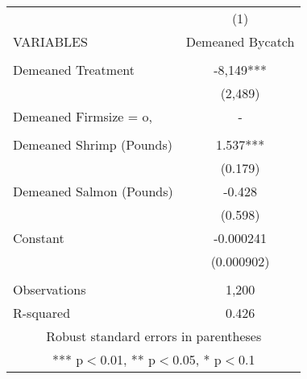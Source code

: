 \begin{tabular}{lc} \hline
 & (1) \\
VARIABLES & Demeaned Bycatch \\ \hline
 &  \\
Demeaned Treatment & -8,149*** \\
 & (2,489) \\
Demeaned Firmsize = o, & - \\
 &  \\
Demeaned Shrimp (Pounds) & 1.537*** \\
 & (0.179) \\
Demeaned Salmon (Pounds) & -0.428 \\
 & (0.598) \\
Constant & -0.000241 \\
 & (0.000902) \\
 &  \\
Observations & 1,200 \\
 R-squared & 0.426 \\ \hline
\multicolumn{2}{c}{ Robust standard errors in parentheses} \\
\multicolumn{2}{c}{ *** p$<$0.01, ** p$<$0.05, * p$<$0.1} \\
\end{tabular}
